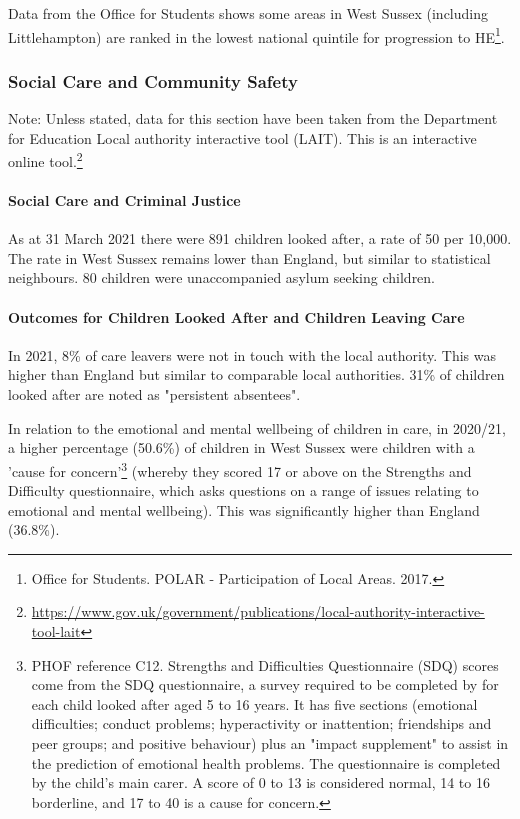 Data from the Office for Students shows some areas in West Sussex (including Littlehampton) are ranked in the lowest national quintile for progression to HE\footnote{Office for Students. POLAR - Participation of Local Areas. 2017.}.

\subsubsection{Social Care and Community Safety}
Note: Unless stated, data for this section have been taken from the Department for Education Local authority interactive tool (LAIT). This is an interactive online tool.\footnote{\url{https://www.gov.uk/government/publications/local-authority-interactive-tool-lait}}
\paragraph{Social Care and Criminal Justice}

As at 31 March 2021 there were 891 children looked after, a rate of 50 per 10,000. The rate in West Sussex remains lower than England, but similar to statistical neighbours. 80 children were unaccompanied asylum seeking children.

\paragraph{Outcomes for Children Looked After and Children Leaving Care}
In 2021, 8\% of care leavers were not in touch with the local authority. This was higher than England but similar to comparable local authorities. 31\% of children looked after are noted as "persistent absentees".

In relation to the emotional and mental wellbeing of children in care, in 2020/21, a higher percentage (50.6\%) of children in West Sussex were children with a 'cause for concern'\footnote{PHOF reference C12. Strengths and Difficulties Questionnaire (SDQ) scores come from the SDQ questionnaire, a survey required to be completed by for each child looked after aged 5 to 16 years. It has five sections (emotional difficulties; conduct problems; hyperactivity or inattention; friendships and peer groups; and positive behaviour) plus an "impact supplement" to assist in the prediction of emotional health problems. The questionnaire is completed by the child's main carer. A score of 0 to 13 is considered normal, 14 to 16 borderline, and 17 to 40 is a cause for concern.} (whereby they scored 17 or above on the Strengths and Difficulty questionnaire, which asks questions on a range of issues relating to emotional and mental wellbeing). This was significantly higher than England (36.8\%).

